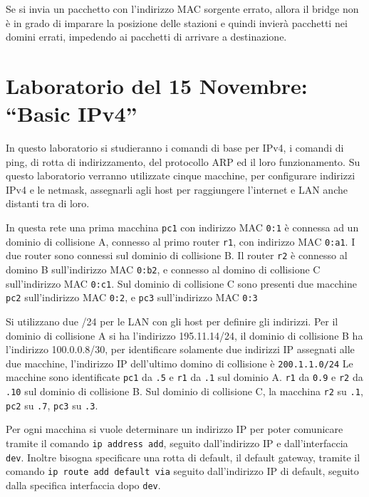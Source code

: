 \documentclass{article}
\numberwithin{equation}{subsection}
\begin{document}
Se si invia un pacchetto con l'indirizzo MAC sorgente errato, allora il bridge non è in grado di imparare la posizione delle stazioni e quindi invierà pacchetti 
nei domini errati, impedendo ai pacchetti di arrivare a destinazione. 

\clearpage

\section{Laboratorio del 15 Novembre: ``Basic IPv4''}


In questo laboratorio si studieranno i comandi di base per IPv4, i comandi di ping, di rotta di indirizzamento, del protocollo ARP ed il loro 
funzionamento. 
Su questo laboratorio verranno utilizzate cinque macchine, per configurare indirizzi IPv4 e le netmask, assegnarli agli host per 
raggiungere l'internet e LAN anche distanti tra di loro. 


In questa rete una prima macchina \verb|pc1| con indirizzo MAC \verb|0:1| è connessa ad un dominio di collisione A, connesso al primo router \verb|r1|, 
con indirizzo MAC \verb|0:a1|. I due router sono connessi sul dominio di collisione B. Il router \verb|r2| è connesso al domino B sull'indirizzo 
MAC \verb|0:b2|, e connesso al domino di collisione C sull'indirizzo MAC \verb|0:c1|. Sul dominio di collisione C sono presenti due macchine \verb|pc2| 
sull'indirizzo MAC \verb|0:2|, e \verb|pc3| sull'indirizzo MAC \verb|0:3|


Si utilizzano due /24 per le LAN con gli host per definire gli indirizzi. Per il dominio di collisione A si ha l'indirizzo 195.11.14/24, il 
dominio di collisione B ha l'indirizzo 100.0.0.8/30, per identificare solamente due indirizzi IP assegnati alle due macchine, l'indirizzo 
IP dell'ultimo domino di collisione è \verb|200.1.1.0/24|
Le macchine sono identificate \verb|pc1| da \verb|.5| e \verb|r1| da \verb|.1| sul dominio A. \verb|r1| da \verb|0.9| e \verb|r2| da \verb|.10| sul dominio 
di collisione B. Sul dominio di collisione C, la macchina \verb|r2| su \verb|.1|, \verb|pc2| su \verb|.7|, \verb|pc3| su \verb|.3|. 

Per ogni macchina si vuole determinare un indirizzo IP per poter comunicare tramite il comando \verb|ip address add|, seguito dall'indirizzo IP e dall'interfaccia \verb|dev|. 
Inoltre bisogna specificare una rotta di default, il default gateway, tramite il comando \verb|ip route add default via| seguito dall'indirizzo IP di default, seguito 
dalla specifica interfaccia dopo \verb|dev|. 
\end{document}
